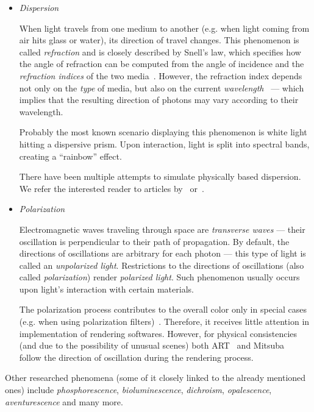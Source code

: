 \begin{itemize}
\item \emph{Dispersion}

When light travels from one medium to another (e.g. when light coming from air hits glass or water), its direction of travel changes. This phenomenon is called \emph{refraction} and is closely described by Snell's law, which specifies how the angle of refraction can be computed from the angle of incidence and the \emph{refraction indices} of the two media~\cite{snellsLaw}. However, the refraction index depends not only on the \emph{type} of media, but also on the current \emph{wavelength}~\cite{dispersionRendering1} --- which implies that the resulting direction of photons may vary according to their wavelength.

Probably the most known scenario displaying this phenomenon is white light hitting a dispersive prism. Upon interaction, light is split into spectral bands, creating a ``rainbow'' effect.

There have been multiple attempts to simulate physically based dispersion. We refer the interested reader to articles by~\citet{dispersionRendering1} or~\citet{dispersionRendering2}.

\item \emph{Polarization}

Electromagnetic waves traveling through space are \emph{transverse waves} --- their oscillation is perpendicular to their path of propagation. By default, the directions of oscillations are arbitrary for each photon --- this type of light is called an \emph{unpolarized light}. Restrictions to the directions of oscillations (also called \emph{polarization}) render \emph{polarized light}. Such phenomenon usually occurs upon light's interaction with certain materials.

The polarization process contributes to the overall color only in special cases (e.g. when using polarization filters)~\cite{fluorescencePolarization}. Therefore, it receives little attention in implementation of rendering softwares. However, for physical consistencies (and due to the possibility of unusual scenes) both ART~\cite{ART} and Mitsuba~\cite{Mitsuba2} follow the direction of oscillation during the rendering process.
\end{itemize}

Other researched phenomena (some of it closely linked to the already mentioned ones) include \emph{phosphorescence}, \emph{bioluminescence}, \emph{dichroism}, \emph{opalescence}, \emph{aventurescence} and many more.

